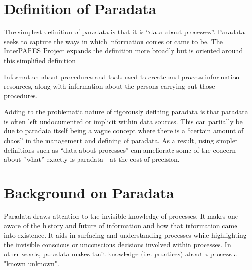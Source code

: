 \documentclass[class=article, crop=false]{standalone}
\begin{document}
\label{first}

\section{Definition of Paradata}
\label{first}

The simplest definition of paradata is that it is ``data about processes''. \cite{huvilaPerspectivesParadataResearch2024}
Paradata seeks to capture the ways in which information comes or came to be.
The InterPARES Project expands the definition more broadly but is oriented around this simplified definition \cite{davet2022tracking}:

\begin{displayquote}
Information about procedures and tools used to create and process information resources, along with information about the persons carrying out those procedures.
\end{displayquote}

Adding to the problematic nature of rigorously defining paradata is that paradata is often left undocumented or implicit within data sources. \cite{borjesson2022re,huvila2021documenting}
This can partially be due to paradata itself being a vague concept where there is a ``certain amount of chaos'' in the management and defining of paradata. \cite{cohen2024paradata}
As a result, using simpler definitions such as ``data about processes'' can ameliorate some of the concern about ``what'' exactly is paradata - at the cost of precision.

\printbib

\section{Background on Paradata}
\label{first}

Paradata draws attention to the invisible knowledge of processes. \cite{prusak2001did}
It makes one aware of the history and future of information and how that information came into existence.
It aids in surfacing and understanding processes while highlighting the invisible conscious or unconscious decisions involved within processes.
In other words, paradata makes tacit knowledge (i.e. practices) about a process a "known unknown". \cite{huggett2020capturing}
\end{document}
